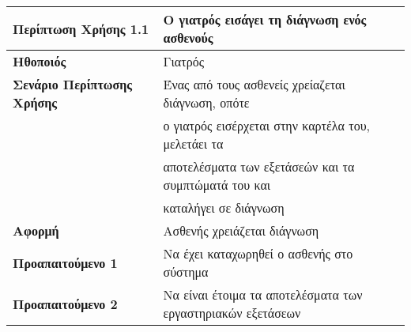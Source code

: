 \documentclass{article}
\newcommand\T{\rule{0pt}{2.6ex}}       %
\newcommand\B{\rule[-1.2ex]{0pt}{0pt}}
\begin{document}
 \begin{center}
     \begin{tabular}{|l|l|}
     \hline
      \textbf{Περίπτωση Χρήσης 1.1} & Ο γιατρός εισάγει τη διάγνωση ενός ασθενούς \T\B \\ 
      \hline
      \textbf{Ηθοποιός} & Γιατρός \T\B \\
      \hline
      \textbf{Σενάριο Περίπτωσης Χρήσης} & Ένας από τους ασθενείς χρείαζεται διάγνωση, οπότε \T\\& ο γιατρός εισέρχεται στην καρτέλα του, μελετάει τα\\& αποτελέσματα των εξετάσεών και τα συμπτώματά του και \\& καταλήγει σε διάγνωση \B \\
      \hline
      \textbf{Αφορμή} & Ασθενής χρειάζεται διάγνωση \T\B \\
      \hline
      \textbf{Προαπαιτούμενο 1} & Να έχει καταχωρηθεί ο ασθενής στο σύστημα \T\B \\
      \hline
      \textbf{Προαπαιτούμενο 2} & Να είναι έτοιμα τα αποτελέσματα των εργαστηριακών εξετάσεων \T\B \\
      \hline
     \end{tabular}
 \end{center}
 
\vspace{0.2cm}
 
\end{document}
